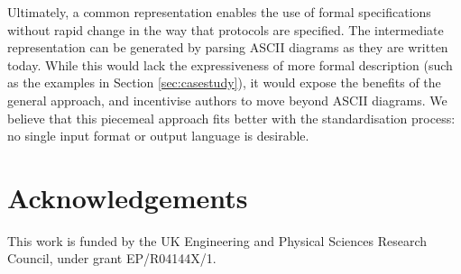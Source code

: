 \documentclass[10pt,sigconf]{acmart}
\begin{document}
Ultimately, a common representation enables the use of formal specifications without rapid
change in the way that protocols are specified. The intermediate representation can be
generated by parsing ASCII diagrams as they are written today. While this would lack the
expressiveness of more formal description (such as the examples in Section
\ref{sec:casestudy}), it would expose the benefits of the general approach, and
incentivise authors to move beyond ASCII diagrams. We believe that this piecemeal approach
fits better with the standardisation process: no single input format or output language is
desirable.

\section{Acknowledgements}

This work is funded by the UK Engineering and Physical Sciences Research Council, under
grant EP/R04144X/1.

\balance


\end{document}
